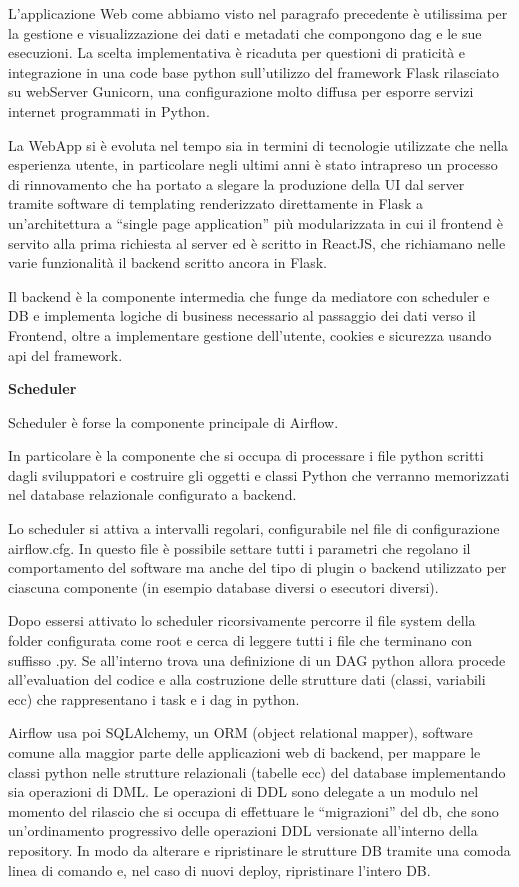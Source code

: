\documentclass[a4paper,12pt]{report}
\begin{document}
L’applicazione Web come abbiamo visto nel paragrafo precedente è utilissima per la gestione e visualizzazione dei dati e metadati che compongono dag e le sue esecuzioni. La scelta implementativa è ricaduta per questioni di praticità e integrazione in una code base python sull’utilizzo del framework Flask rilasciato su webServer Gunicorn, una configurazione molto diffusa per esporre servizi internet programmati in Python.

La WebApp si è evoluta nel tempo sia in termini di tecnologie utilizzate che nella esperienza utente, in particolare negli ultimi anni è stato intrapreso un processo di rinnovamento che ha portato a slegare la produzione della UI dal server tramite software di templating renderizzato direttamente in Flask a un’architettura a “single page application” più modularizzata in cui il frontend è servito alla prima richiesta al server ed è scritto in ReactJS, che richiamano nelle varie funzionalità il backend scritto ancora in Flask.

Il backend è la componente intermedia che funge da mediatore con scheduler e  DB e implementa logiche di business necessario al passaggio dei dati verso il Frontend, oltre a implementare gestione dell’utente, cookies e sicurezza usando api del framework.

\noindent
\textbf{Scheduler}

Scheduler è forse la componente principale di Airflow. 

In particolare è la componente che si occupa di processare i file python scritti dagli sviluppatori e costruire gli oggetti e classi Python che verranno memorizzati nel database relazionale configurato a backend. 

Lo scheduler si attiva a intervalli regolari, configurabile nel file di configurazione airflow.cfg. In questo file è possibile settare tutti i parametri che regolano il comportamento del software ma anche del tipo di plugin o backend utilizzato per ciascuna componente (in esempio database diversi o esecutori diversi).

Dopo essersi attivato lo scheduler ricorsivamente percorre il file system della folder configurata come root e cerca di leggere tutti i file che terminano con suffisso .py. Se all’interno trova una definizione di un DAG python allora procede all’evaluation del codice e alla costruzione delle strutture dati (classi, variabili ecc) che rappresentano i task e i dag in python. 

Airflow usa poi SQLAlchemy, un ORM (object relational mapper), software comune alla maggior parte delle applicazioni web di backend, per mappare le classi python nelle strutture relazionali (tabelle ecc) del database implementando sia operazioni di DML. Le operazioni di DDL sono delegate a un modulo nel momento del rilascio che si occupa di effettuare le “migrazioni” del db, che sono un’ordinamento progressivo delle operazioni DDL versionate all’interno della repository. In modo da alterare e ripristinare le strutture DB tramite una comoda linea di comando e, nel caso di nuovi deploy, ripristinare l’intero DB.
\end{document}
